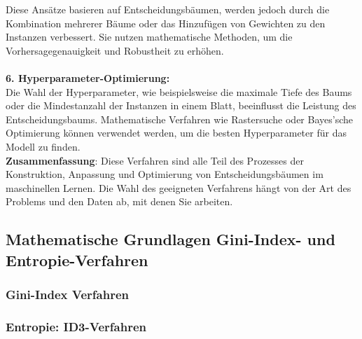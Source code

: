 \documentclass[12pt]{article}
\begin{document}
Diese Ansätze basieren auf Entscheidungsbäumen, werden jedoch durch die Kombination mehrerer Bäume oder das Hinzufügen von Gewichten zu den Instanzen verbessert. Sie nutzen mathematische Methoden, um die Vorhersagegenauigkeit und Robustheit zu erhöhen.\\\\[0.2cm]
%
\textbf{6. Hyperparameter-Optimierung:}\\
Die Wahl der Hyperparameter, wie beispielsweise die maximale Tiefe des Baums oder die Mindestanzahl der Instanzen in einem Blatt, beeinflusst die Leistung des Entscheidungsbaums. Mathematische Verfahren wie Rastersuche oder Bayes'sche Optimierung können verwendet werden, um die besten Hyperparameter für das Modell zu finden.\\[0.2cm]
%
\textbf{Zusammenfassung}:
Diese Verfahren sind alle Teil des Prozesses der Konstruktion, Anpassung und Optimierung von Entscheidungsbäumen im maschinellen Lernen. Die Wahl des geeigneten Verfahrens hängt von der Art des Problems und den Daten ab, mit denen Sie arbeiten.\\[0.4cm]

\subsection{Mathematische Grundlagen Gini-Index- und Entropie-Verfahren }


\subsubsection{Gini-Index Verfahren}

{\color{red}{*******************************************************************\\ 
ab hier bis Ende der section sind die Folien der Vorlesung ML  zu nutzen und diese sind in Latex umzusetzen\\
********************************************************************\\}}



\subsubsection{Entropie: ID3-Verfahren}
\end{document}
